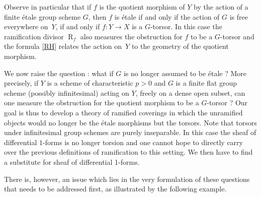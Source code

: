 \documentclass{amsart}
\theoremstyle{definition}
\theoremstyle{remark}
\begin{document}
Observe in particular that if $f$ is the quotient morphism of $Y$ by the action of a finite \'etale group scheme $G$, then $f$ is \'etale if and only if the action of $G$ is free everywhere on~$Y$, if and only if $f : Y {\longrightarrow} X$ is a $G$-torsor. In this case the ramification divisor $\operatorname{R}_f$ also measures the obstruction for $f$ to be a $G$-torsor and the formula \eqref{RH} relates the action on~$Y$ to the geometry of the quotient morphism. 

We now raise the question : what if $G$ is no longer assumed to be \'etale ? 
More precisely, if $Y$ is a scheme of characteristic $p > 0$ and $G$ is a finite flat group scheme (possibly infinitesimal) acting on $Y$, freely on a dense open subset, can one measure the obstruction for the quotient morphism to be a $G$-torsor ? Our goal is thus to develop a theory of ramified coverings in which the unramified objects would no longer be the \'etale morphisms but the torsors. Note that torsors under infinitesimal group schemes are purely inseparable. In this case the sheaf of differential $1$-forms is no longer torsion and one cannot hope to directly carry over the previous definitions of ramification to this setting. We then have to find a substitute for sheaf of differential 1-forms.

There is, however, an issue which lies in the very formulation of these questions that needs to be addressed first, as illustrated by the following example.
\end{document}
